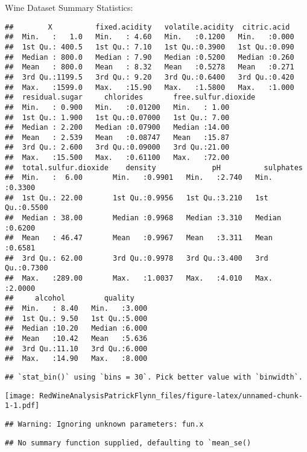 \documentclass[]{article}
\begin{document}
Wine Dataset Summary Statistics:

\begin{verbatim}
##        X          fixed.acidity   volatile.acidity  citric.acid   
##  Min.   :   1.0   Min.   : 4.60   Min.   :0.1200   Min.   :0.000  
##  1st Qu.: 400.5   1st Qu.: 7.10   1st Qu.:0.3900   1st Qu.:0.090  
##  Median : 800.0   Median : 7.90   Median :0.5200   Median :0.260  
##  Mean   : 800.0   Mean   : 8.32   Mean   :0.5278   Mean   :0.271  
##  3rd Qu.:1199.5   3rd Qu.: 9.20   3rd Qu.:0.6400   3rd Qu.:0.420  
##  Max.   :1599.0   Max.   :15.90   Max.   :1.5800   Max.   :1.000  
##  residual.sugar     chlorides       free.sulfur.dioxide
##  Min.   : 0.900   Min.   :0.01200   Min.   : 1.00      
##  1st Qu.: 1.900   1st Qu.:0.07000   1st Qu.: 7.00      
##  Median : 2.200   Median :0.07900   Median :14.00      
##  Mean   : 2.539   Mean   :0.08747   Mean   :15.87      
##  3rd Qu.: 2.600   3rd Qu.:0.09000   3rd Qu.:21.00      
##  Max.   :15.500   Max.   :0.61100   Max.   :72.00      
##  total.sulfur.dioxide    density             pH          sulphates     
##  Min.   :  6.00       Min.   :0.9901   Min.   :2.740   Min.   :0.3300  
##  1st Qu.: 22.00       1st Qu.:0.9956   1st Qu.:3.210   1st Qu.:0.5500  
##  Median : 38.00       Median :0.9968   Median :3.310   Median :0.6200  
##  Mean   : 46.47       Mean   :0.9967   Mean   :3.311   Mean   :0.6581  
##  3rd Qu.: 62.00       3rd Qu.:0.9978   3rd Qu.:3.400   3rd Qu.:0.7300  
##  Max.   :289.00       Max.   :1.0037   Max.   :4.010   Max.   :2.0000  
##     alcohol         quality     
##  Min.   : 8.40   Min.   :3.000  
##  1st Qu.: 9.50   1st Qu.:5.000  
##  Median :10.20   Median :6.000  
##  Mean   :10.42   Mean   :5.636  
##  3rd Qu.:11.10   3rd Qu.:6.000  
##  Max.   :14.90   Max.   :8.000
\end{verbatim}

\begin{verbatim}
## `stat_bin()` using `bins = 30`. Pick better value with `binwidth`.
\end{verbatim}

\texttt{[image: RedWineAnalysisPatrickFlynn\_files/figure-latex/unnamed-chunk-1-1.pdf]}

\begin{verbatim}
## Warning: Ignoring unknown parameters: fun.x
\end{verbatim}

\begin{verbatim}
## No summary function supplied, defaulting to `mean_se()
\end{verbatim}
\end{document}
